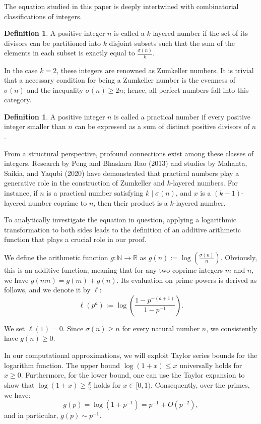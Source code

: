 \documentclass[12pt, a4paper]{article}
\theoremstyle{plain}
\theoremstyle{definition}
\newtheorem{definition}[theorem]{Definition}
\begin{document}
The equation studied in this paper is deeply intertwined with combinatorial classifications of integers.

\begin{definition}
A positive integer $n$ is called a $k$-layered number if the set of its divisors can be partitioned into $k$ disjoint subsets such that the sum of the elements in each subset is exactly equal to $\frac{\sigma(n)}{k}$.
\end{definition}

In the case $k = 2$, these integers are renowned as Zumkeller numbers. It is trivial that a necessary condition for being a Zumkeller number is the evenness of $\sigma(n)$ and the inequality $\sigma(n) \geq 2n$; hence, all perfect numbers fall into this category.

\begin{definition}
A positive integer $n$ is called a practical number if every positive integer smaller than $n$ can be expressed as a sum of distinct positive divisors of $n$.
\end{definition}

From a structural perspective, profound connections exist among these classes of integers. Research by Peng and Bhaskara Rao (2013) and studies by Mahanta, Saikia, and Yaqubi (2020) have demonstrated that practical numbers play a generative role in the construction of Zumkeller and $k$-layered numbers. For instance, if $n$ is a practical number satisfying $k \mid \sigma(n)$, and $x$ is a $(k-1)$-layered number coprime to $n$, then their product is a $k$-layered number.

To analytically investigate the equation in question, applying a logarithmic transformation to both sides leads to the definition of an additive arithmetic function that plays a crucial role in our proof.

We define the arithmetic function $g: \mathbb{N} \to \mathbb{R}$ as $g(n) := \log \left(\frac{\sigma(n)}{n}\right)$. Obviously, this is an additive function; meaning that for any two coprime integers $m$ and $n$, we have $g(mn) = g(m) + g(n)$. Its evaluation on prime powers is derived as follows, and we denote it by $\ell$:
\[ \ell(p^a) := \log \left( \frac{1 - p^{-(a+1)}}{1 - p^{-1}} \right). \]

We set $\ell(1) = 0$. Since $\sigma(n) \geq n$ for every natural number $n$, we consistently have $g(n) \geq 0$.

In our computational approximations, we will exploit Taylor series bounds for the logarithm function. The upper bound $\log(1 + x) \leq x$ universally holds for $x \geq 0$. Furthermore, for the lower bound, one can use the Taylor expansion to show that $\log(1 + x) \geq \frac{x}{2}$ holds for $x \in [0, 1)$. Consequently, over the primes, we have:
\[ g(p) = \log(1 + p^{-1}) = p^{-1} + O(p^{-2}), \]
and in particular, $g(p) \sim p^{-1}$.
\end{document}
